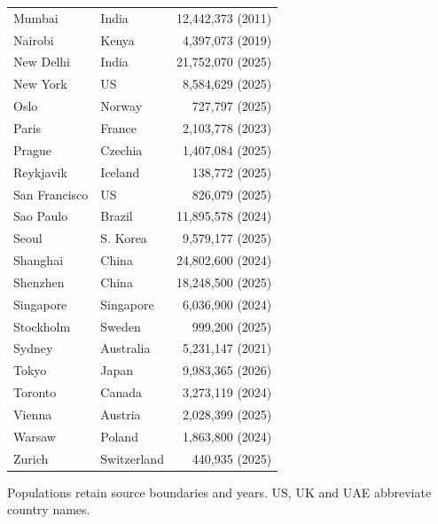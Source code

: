 \documentclass{mcmthesis}
\begin{document}
\begin{table}[!htbp]
\begin{minipage}[t]{.49\linewidth}
\begin{tabular}{@{}llr@{}}
Mumbai & India & 12,442,373 (2011)\\
Nairobi & Kenya & 4,397,073 (2019)\\
New Delhi & India & 21,752,070 (2025)\\
New York & US & 8,584,629 (2025)\\
Oslo & Norway & 727,797 (2025)\\
Paris & France & 2,103,778 (2023)\\
Prague & Czechia & 1,407,084 (2025)\\
Reykjavik & Iceland & 138,772 (2025)\\
San Francisco & US & 826,079 (2025)\\
Sao Paulo & Brazil & 11,895,578 (2024)\\
Seoul & S. Korea & 9,579,177 (2025)\\
Shanghai & China & 24,802,600 (2024)\\
Shenzhen & China & 18,248,500 (2025)\\
Singapore & Singapore & 6,036,900 (2024)\\
Stockholm & Sweden & 999,200 (2025)\\
Sydney & Australia & 5,231,147 (2021)\\
Tokyo & Japan & 9,983,365 (2026)\\
Toronto & Canada & 3,273,119 (2024)\\
Vienna & Austria & 2,028,399 (2025)\\
Warsaw & Poland & 1,863,800 (2024)\\
Zurich & Switzerland & 440,935 (2025)\\
\bottomrule\end{tabular}\end{minipage}
\par\smallskip
Populations retain source boundaries and years. US, UK and UAE abbreviate
country names.
\endgroup
\end{table}
\end{document}
